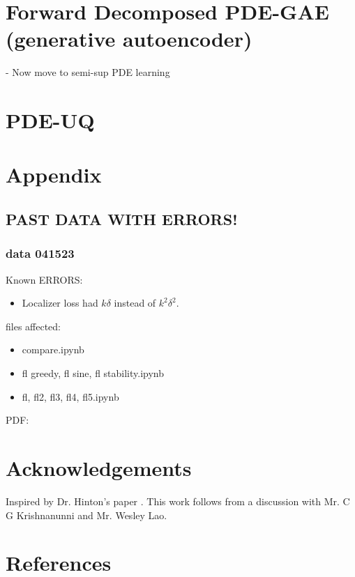 \documentclass[12pt]{iopart}
\theoremstyle{break}
\newcommand*{\sfig}[2]{\begin{figure}[htpb]\centering\subfloat[#2]{\texttt{[image: \#1]}}\end{figure}}
\begin{document}
\section{Forward Decomposed PDE-GAE (generative autoencoder)}
- Now move to semi-sup PDE learning
	
\section{PDE-UQ}
	
\section{Appendix}
\subsection{PAST DATA WITH ERRORS!}
\subsubsection{data 041523}
Known ERRORS:
\begin{itemize}
	    \item Localizer loss had $k\delta$ instead of $k^2 \delta^2$. 
\end{itemize}
files affected:
	
\begin{itemize}
\item compare.ipynb
\item fl greedy, fl sine, fl stability.ipynb
\item fl, fl2, fl3, fl4, fl5.ipynb
\end{itemize}
	
PDF:
	

	
\section{Acknowledgements}
Inspired by Dr. Hinton's paper \cite{FFA23}.
This work follows from a discussion with Mr. C G Krishnanunni and Mr. Wesley Lao.
\section{References}

\end{document}
